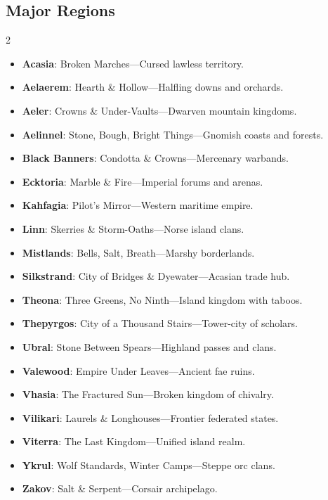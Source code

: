 \documentclass[11pt,twoside]{article}
\begin{document}
\subsection{Major Regions}
\begin{multicols}{2}
\begin{itemize}[leftmargin=*]
    \item \textbf{Acasia}: Broken Marches---Cursed lawless territory.
    \item \textbf{Aelaerem}: Hearth \& Hollow---Halfling downs and orchards.
    \item \textbf{Aeler}: Crowns \& Under-Vaults---Dwarven mountain kingdoms.
    \item \textbf{Aelinnel}: Stone, Bough, Bright Things---Gnomish coasts and forests.
    \item \textbf{Black Banners}: Condotta \& Crowns---Mercenary warbands.
    \item \textbf{Ecktoria}: Marble \& Fire---Imperial forums and arenas.
    \item \textbf{Kahfagia}: Pilot's Mirror---Western maritime empire.
    \item \textbf{Linn}: Skerries \& Storm-Oaths---Norse island clans.
    \item \textbf{Mistlands}: Bells, Salt, Breath---Marshy borderlands.
    \item \textbf{Silkstrand}: City of Bridges \& Dyewater---Acasian trade hub.
    \item \textbf{Theona}: Three Greens, No Ninth---Island kingdom with taboos.
    \item \textbf{Thepyrgos}: City of a Thousand Stairs---Tower-city of scholars.
    \item \textbf{Ubral}: Stone Between Spears---Highland passes and clans.
    \item \textbf{Valewood}: Empire Under Leaves---Ancient fae ruins.
    \item \textbf{Vhasia}: The Fractured Sun---Broken kingdom of chivalry.
    \item \textbf{Vilikari}: Laurels \& Longhouses---Frontier federated states.
    \item \textbf{Viterra}: The Last Kingdom---Unified island realm.
    \item \textbf{Ykrul}: Wolf Standards, Winter Camps---Steppe orc clans.
    \item \textbf{Zakov}: Salt \& Serpent---Corsair archipelago.
\end{itemize}
\end{multicols}
\end{document}
